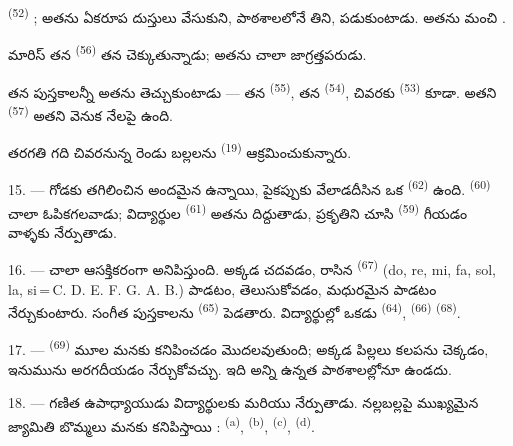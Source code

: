  \textsuperscript{(52)} ; అతను ఏకరూప దుస్తులు వేసుకుని, పాఠశాలలోనే తిని, పడుకుంటాడు. అతను మంచి .

మారిస్ తన  \textsuperscript{(56)} తన  చెక్కుతున్నాడు; అతను
చాలా జాగ్రత్తపరుడు.

తన పుస్తకాలన్నీ అతను తెచ్చుకుంటాడు — తన  \textsuperscript{(55)}, తన
 \textsuperscript{(54)}, చివరకు 
\textsuperscript{(53)} కూడా. అతని  \textsuperscript{(57)} అతని వెనుక నేలపై
ఉంది.

తరగతి గది చివరనున్న రెండు బల్లలను  \textsuperscript{(19)}
ఆక్రమించుకున్నారు.

\VUsaut{4.6mm}
\VUsaut{3.4mm}

15. ---  గోడకు తగిలించిన అందమైన  ఉన్నాయి, పైకప్పుకు
వేలాడదీసిన  ఒక  \textsuperscript{(62)} ఉంది.
 \textsuperscript{(60)} చాలా ఓపికగలవాడు; విద్యార్థుల 
\textsuperscript{(61)} అతను దిద్దుతాడు, ప్రకృతిని చూసి 
\textsuperscript{(59)} గీయడం వాళ్ళకు నేర్పుతాడు.

16. ---  చాలా ఆసక్తికరంగా అనిపిస్తుంది. అక్కడ  చదవడం,
 రాసిన  \textsuperscript{(67)} (do, re, mi, fa, sol,
la, si\,=\,C. D. E. F. G. A. B.) పాడటం,  తెలుసుకోవడం, మధురమైన
 పాడటం నేర్చుకుంటారు. సంగీత పుస్తకాలను  \textsuperscript{(65)}
పెడతారు. విద్యార్థుల్లో ఒకడు  \textsuperscript{(64)},
 \textsuperscript{(66)} 
\textsuperscript{(68)}.

17. ---  \textsuperscript{(69)}  మూల మనకు కనిపించడం
మొదలవుతుంది; అక్కడ పిల్లలు కలపను చెక్కడం, ఇనుమును అరగదీయడం నేర్చుకోవచ్చు. ఇది అన్ని ఉన్నత
పాఠశాలల్లోనూ ఉండదు.

\VUsaut{5.0mm}
\VUsaut{3.6mm}

18. --- గణిత ఉపాధ్యాయుడు విద్యార్థులకు  మరియు
 నేర్పుతాడు. నల్లబల్లపై ముఖ్యమైన జ్యామితి బొమ్మలు మనకు కనిపిస్తాయి :
 \textsuperscript{(a)},  \textsuperscript{(b)},
 \textsuperscript{(c)},  \textsuperscript{(d)}.

